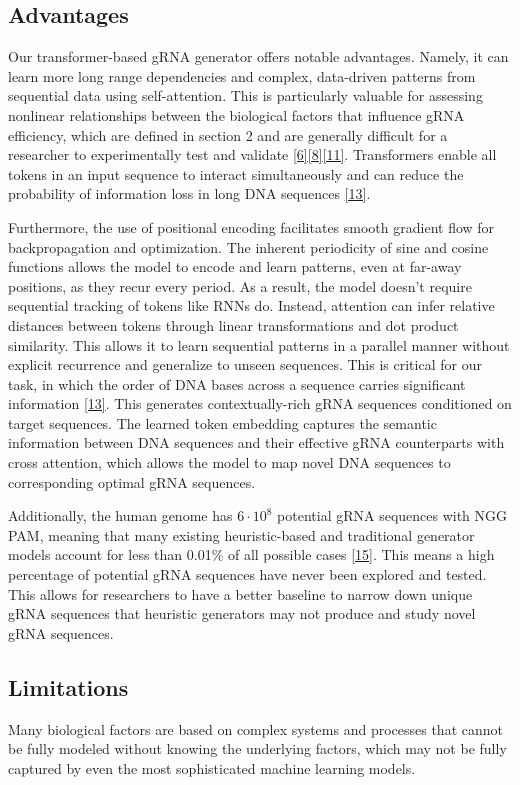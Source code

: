 \documentclass{article}
\begin{document}
\subsection{Advantages}
Our transformer-based gRNA generator offers notable advantages. Namely, it can learn more long range dependencies and complex, data-driven patterns from sequential data using self-attention. This is particularly valuable for assessing nonlinear relationships between the biological factors that influence gRNA efficiency, which are defined in section 2 and are generally difficult for a researcher to experimentally test and validate \hyperref[Reference 6]{[6]}\hyperref[Reference 8]{[8]}\hyperref[Reference 11]{[11]}. Transformers enable all tokens in an input sequence to interact simultaneously and can reduce the probability of information loss in long DNA sequences \hyperref[Reference 13]{[13]}.

Furthermore, the use of positional encoding facilitates smooth gradient flow for backpropagation and optimization. The inherent periodicity of sine and cosine functions allows the model to encode and learn patterns, even at far-away positions, as they recur every period.  As a result, the model doesn't require sequential tracking of tokens like RNNs do. Instead, attention can infer relative distances between tokens through linear transformations and dot product similarity. This allows it to learn sequential patterns in a parallel manner without explicit recurrence and generalize to unseen sequences. This is critical for our task, in which the order of DNA bases across a sequence carries significant information \hyperref[Reference 13]{[13]}. This generates contextually-rich gRNA sequences conditioned on target sequences. The learned token embedding captures the semantic information between DNA sequences and their effective gRNA counterparts with cross attention, which allows the model to map novel DNA sequences to corresponding optimal gRNA sequences.

Additionally, the human genome has $6\cdot10^8$ potential gRNA sequences with NGG PAM, meaning that many existing heuristic-based and traditional generator models account for less than 0.01\% of all possible cases \hyperref[Reference 15]{[15]}. This means a high percentage of potential gRNA sequences have never been explored and tested. This allows for researchers to have a better baseline to narrow down unique gRNA sequences that heuristic generators may not produce and study novel gRNA sequences.


\subsection{Limitations}
Many biological factors are based on complex systems and processes that cannot be fully modeled without knowing the underlying factors, which may not be fully captured by even the most sophisticated machine learning models. 
\end{document}
